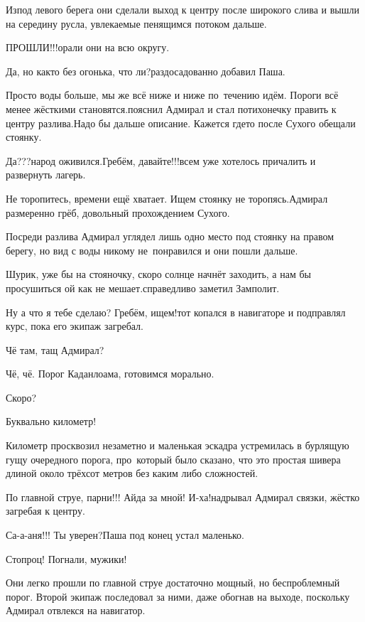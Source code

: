 Из\sdash под левого берега они сделали выход к центру после широкого слива и вышли на середину русла, увлекаемые пенящимся потоком дальше.

\diagdash ПРОШЛИ!!!\mdash орали они на всю округу.

\diagdash Да, но как\sdash то без огонька, что ли?\mdash раздосадованно добавил Паша.

\diagdash Просто воды больше, мы же всё ниже и ниже по~течению идём. Пороги всё менее жёсткими становятся.\mdash пояснил Адмирал и стал потихонечку править к центру разлива.\mdash Надо бы дальше описание. Кажется где\sdash то после Сухого обещали стоянку.

\diagdash Да???\mdash народ оживился.\mdash Гребём, давайте!!!\mdash всем уже хотелось причалить и развернуть лагерь.

\diagdash Не торопитесь, времени ещё хватает. Ищем стоянку не торопясь.\mdash Адмирал размеренно грёб, довольный прохождением Сухого.

Посреди разлива Адмирал углядел лишь одно место под стоянку на правом берегу, но вид с воды никому не~понравился и они пошли дальше.

\diagdash Шурик, уже бы на стояночку, скоро солнце начнёт заходить, а нам бы просушиться ой как не мешает.\mdash справедливо заметил Замполит.

\diagdash Ну а что я тебе сделаю? Гребём, ищем!\mdash тот копался в навигаторе и подправлял курс, пока его экипаж загребал.

\diagdash Чё там, тащ Адмирал?

\diagdash Чё, чё. Порог Каданлоама, готовимся морально.

\diagdash Скоро? 

\diagdash Буквально километр!

Километр просквозил незаметно и маленькая эскадра устремилась в бурлящую гущу очередного порога, про~который было сказано, что это простая шивера длиной около трёхсот метров без каким либо сложностей.

\diagdash По главной струе, парни!!! Айда за мной! И-ха!\mdash надрывал Адмирал связки, жёстко загребая к центру.

\diagdash Са-а-аня!!! Ты уверен?\mdash Паша под конец устал маленько.

\diagdash Стопроц! Погнали, мужики!

Они легко прошли по главной струе достаточно мощный, но беспроблемный порог. Второй экипаж последовал за ними, даже обогнав на выходе, поскольку Адмирал отвлекся на навигатор.

